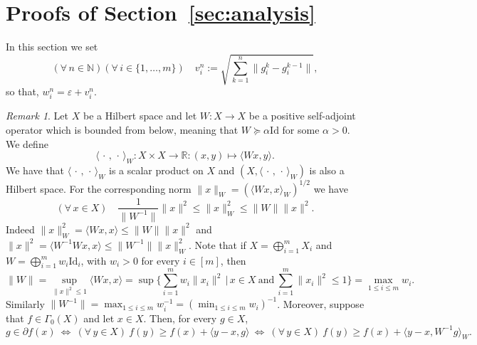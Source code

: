 \documentclass[11pt]{article}
\theoremstyle{plain}
\theoremstyle{definition}
\theoremstyle{remark}
\newtheorem{remark}[theorem]{Remark}
\newcommand{\norm}[1]{\lVert{#1}\rVert}
\newcommand{\scalarp}[1]{\langle{#1}\rangle}
\newcommand{\HH}{X}
\newcommand{\R}{\mathbb{R}}
\newcommand{\x}{x}
\newcommand{\y}{y}
\newcommand{\uu}{g}
\newcommand{\w}{w}
\newcommand{\iter}{n}
\newcommand{\ite}{k}
\newcommand{\N}{\mathbb{N}}
\newcommand{\Id}{\mathrm{Id}}
\newcommand{\W}{W}
\begin{document}
\section{Proofs of Section~\ref{sec:analysis}} 
\label{A}

In this section we set
\begin{equation*}
    (\forall\,\iter\in \N)(\forall\,i\in \{1,\dots, m\})\quad
    v_i^\iter:= \sqrt{\sum_{\ite=1}^\iter\norm{\uu_i^\ite- \uu_i^{\ite-1}}},
\end{equation*}
so that, $\w_i^\iter= \varepsilon + v_i^\iter$.

\begin{remark}
\label{rmk1}
Let $\HH$ be a Hilbert space and let $\W\colon \HH\to \HH$ be a positive self-adjoint operator which is bounded from below, meaning that $\W \succeq \alpha\Id$ for some $\alpha>0$. We define
\begin{equation*}
\scalarp{\,\cdot\,,\,\cdot\,}_\W\colon \HH\times\HH\to \R\colon (\x,\y)\mapsto \scalarp{\W\x,\y}.
\end{equation*}
We have that $\scalarp{\,\cdot\,,\,\cdot\,}_\W$ is a scalar product on $\HH$ and $(\HH, \scalarp{\,\cdot\,,\,\cdot\,}_\W)$ is also a Hilbert space. For the corresponding norm $\norm{\x}_\W = (\scalarp{\W\x,\x}_\W)^{1/2}$ we have
\begin{equation}
\label{eq:20260124a}
(\forall\,\x\in \HH)\quad \frac{1}{\norm{\W^{-1}}} \norm{\x}^2 \leq \norm{\x}_\W^2 \leq \norm{\W}\norm{\x}^2.
\end{equation}
Indeed $\norm{\x}_\W^2 = \scalarp{\W\x,\x} \leq \norm{\W} \norm{\x}^2$
and $\norm{\x}^2 = \scalarp{\W^{-1}\W \x, \x}\leq \norm{\W^{-1}} \norm{\x}_\W^2$.
Note that if $\HH = \bigoplus_{i=1}^m \HH_i$ and $\W = \bigoplus_{i=1}^m \w_i \Id_i$, with $w_i>0$ for every $i\in [m]$, then
\begin{equation*}
\norm{\W} = \sup_{\norm{\x}^2\leq 1} \scalarp{\W\x, \x} =
\sup \bigg\{ \sum_{i=1}^m \w_i \norm{\x_i}^2 \,\Big\vert\, \x\in \HH\ \text{and}\ \sum_{i=1}^m \norm{\x_i}^2\leq 1\bigg\} = \max_{1\leq i\leq m}{\w_i}.
\end{equation*}
Similarly $\norm{\W^{-1}} = \max_{1\leq i\leq m}\w_i^{-1} = (\min_{1\leq i\leq m} \w_i)^{-1}$.
Moreover, suppose that $f\in \Gamma_0(\HH)$ and let $\x\in \HH$. Then, for every $\uu\in \HH$,
\begin{equation*}
\uu\in \partial f(x)\ \Leftrightarrow\ (\forall\, \y\in \HH)\ f(\y) \geq f(\x)+\scalarp{\y-\x, \uu}
\ \Leftrightarrow\ (\forall\, \y\in \HH)\ f(\y) \geq f(\x)+\scalarp{\y-\x, \W^{-1}\uu}_{\W}.

\end{equation*}
\end{remark}
\end{document}
